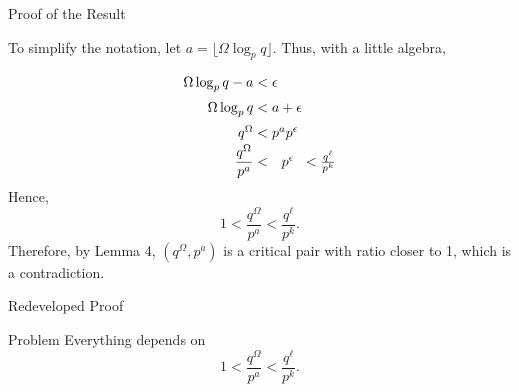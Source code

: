\documentclass{beamer}
\newcommand\floor[1]{\lfloor#1\rfloor}
\begin{document}
\begin{frame}{Proof of the Result}


To simplify the notation, let $a=\floor{\Omega\log_pq}$. Thus, with a little algebra, 
\[\arraycolsep=1.4pt\def\arraystretch{1.5}
\begin{array}{rclcl}
\Omega\log_pq - a &<& \epsilon\\
\Omega\log_pq 	&<&a+\epsilon\\
q^\Omega 		&<& p^{a}p^\epsilon\\
\dfrac{q^\Omega}{p^a}&<&\hspace{7pt}p^\epsilon&<&\frac{q^{\ell}}{p^{k}}\\
\end{array}
\]
Hence,
$$1<\dfrac{q^\Omega}{p^a}<\frac{q^{\ell}}{p^{k}}.$$
Therefore, by Lemma 4, $({q^\Omega},{p^a})$ is a critical pair with ratio closer to 1, which is a contradiction. 
    
\end{frame}
\begin{frame}{Redeveloped Proof}
       
    \begin{block}{Problem}
    Everything depends on
    $$1<\dfrac{q^\Omega}{p^a}<\frac{q^{\ell}}{p^{k}}.$$
    \end{block}

\end{frame}
%    
\end{document}
